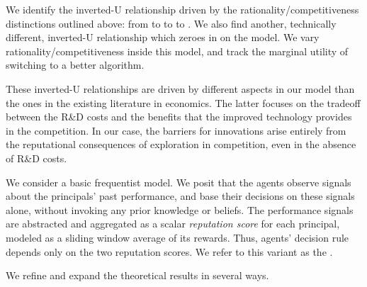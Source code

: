 We identify the inverted-U relationship driven by the rationality/competitiveness distinctions outlined above: from \HardMax to \HardMaxRandom to \SoftMaxRandom to \Uniform. We also find another, technically different, inverted-U relationship which zeroes in on the \HardMaxRandom model. We vary rationality/competitiveness inside this model, and track the marginal utility of switching to a better algorithm.

These inverted-U relationships are driven by different aspects in our model than the ones in the existing literature in economics. The latter focuses on the tradeoff between the R\&D costs and the benefits that the improved technology provides in the competition. In our case, the barriers for innovations arise entirely from the reputational consequences of exploration in competition, even in the absence of R\&D costs.


We consider a basic frequentist model. We posit that the agents observe signals about the principals' past performance, and base their decisions on these signals alone, without invoking any prior knowledge or beliefs. The performance signals are abstracted and aggregated as a scalar \emph{reputation score} for each principal, modeled as a sliding window average of its rewards. Thus, agents' decision rule depends only on the two reputation scores. We refer to this variant as the \emph{\ExptsModel}.%

We refine and expand the theoretical results in several ways.

